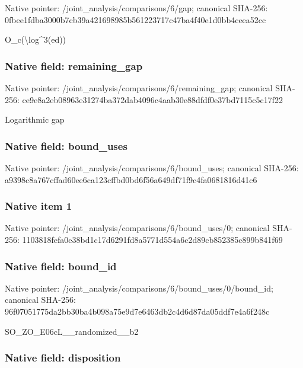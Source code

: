 \documentclass[10pt,a4paper]{article}
\begin{document}
Native pointer: /joint\_analysis/comparisons/6/gap; canonical SHA-256: 0fbee1fdba3000b7cb39a421\allowbreak{}698985b561223717c47ba4f4\allowbreak{}0e1d0bb4ceea52cc


O\_c(\textbackslash{}log\textasciicircum{}3(ed))


\subsubsection{Native field: remaining\_gap}


Native pointer: /joint\_analysis/comparis\allowbreak{}ons/6/remaining\_gap; canonical SHA-256: ce9e8a2eb08963e31274ba37\allowbreak{}2dab4096c4aab30e88dfdf0e\allowbreak{}37bd7115c5c17f22


Logarithmic gap


\subsubsection{Native field: bound\_uses}


Native pointer: /joint\_analysis/comparis\allowbreak{}ons/6/bound\_uses; canonical SHA-256: a9398c8a767cffad60ee6ca1\allowbreak{}23cffbd0bd6f56a649df71f9\allowbreak{}c4fa0681816d41c6



\subsubsection{Native item 1}


Native pointer: /joint\_analysis/comparis\allowbreak{}ons/6/bound\_uses/0; canonical SHA-256: 1103818fefa0e38bd1c17d62\allowbreak{}91fd8a5771d554a6c2d89cb8\allowbreak{}52385c899b841f69



\subsubsection{Native field: bound\_id}


Native pointer: /joint\_analysis/comparis\allowbreak{}ons/6/bound\_uses/0/bound\allowbreak{}\_id; canonical SHA-256: 96f07051775da2bb30ba4b09\allowbreak{}8a75e9d7e6463db2c4d6d87d\allowbreak{}a05ddf7e4a6f248c


SO\_ZO\_E06cL\_\_randomized\_\_b2


\subsubsection{Native field: disposition}
\end{document}
